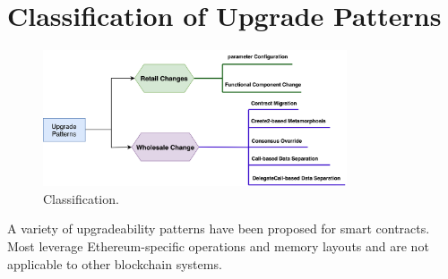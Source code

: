 
\section{Classification of Upgrade Patterns} \label{sec:classification}

\begin{figure}[t]
  \centering
      \includegraphics[width=0.8\textwidth]{figures/New_Classification.png}
  \caption{Classification. \label{fig:class}}
 \end{figure}
 
A variety of upgradeability patterns have been proposed for smart contracts. Most leverage Ethereum-specific operations and memory layouts and are not applicable to other blockchain systems.




